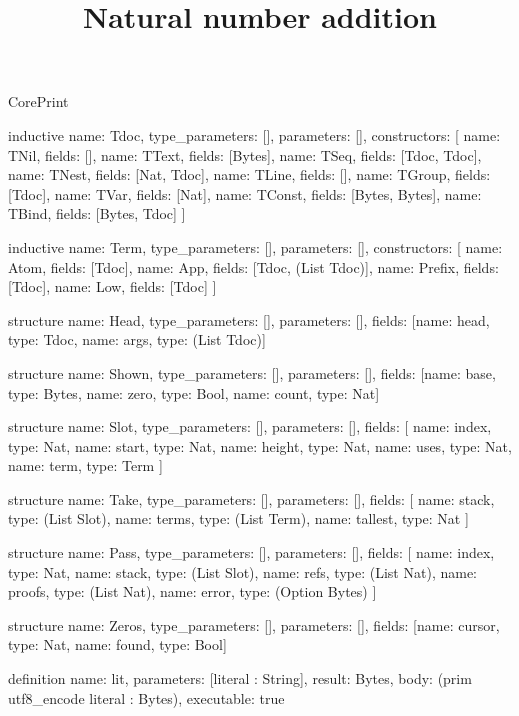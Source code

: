 \begin{lexlean}{CorePrint}
\title{Natural number addition}
\begin{semanticmodule}
inductive{
  name: Tdoc,
  type_parameters: [],
  parameters: [],
  constructors: [
    {name: TNil, fields: []},
    {name: TText, fields: [Bytes]},
    {name: TSeq, fields: [Tdoc, Tdoc]},
    {name: TNest, fields: [Nat, Tdoc]},
    {name: TLine, fields: []},
    {name: TGroup, fields: [Tdoc]},
    {name: TVar, fields: [Nat]},
    {name: TConst, fields: [Bytes, Bytes]},
    {name: TBind, fields: [Bytes, Tdoc]}
  ]
}

inductive{
  name: Term,
  type_parameters: [],
  parameters: [],
  constructors: [
    {name: Atom, fields: [Tdoc]},
    {name: App, fields: [Tdoc, (List Tdoc)]},
    {name: Prefix, fields: [Tdoc]},
    {name: Low, fields: [Tdoc]}
  ]
}

structure{
  name: Head,
  type_parameters: [],
  parameters: [],
  fields: [{name: head, type: Tdoc}, {name: args, type: (List Tdoc)}]
}

structure{
  name: Shown,
  type_parameters: [],
  parameters: [],
  fields: [{name: base, type: Bytes}, {name: zero, type: Bool}, {name: count, type: Nat}]
}

structure{
  name: Slot,
  type_parameters: [],
  parameters: [],
  fields: [
    {name: index, type: Nat},
    {name: start, type: Nat},
    {name: height, type: Nat},
    {name: uses, type: Nat},
    {name: term, type: Term}
  ]
}

structure{
  name: Take,
  type_parameters: [],
  parameters: [],
  fields: [
    {name: stack, type: (List Slot)},
    {name: terms, type: (List Term)},
    {name: tallest, type: Nat}
  ]
}

structure{
  name: Pass,
  type_parameters: [],
  parameters: [],
  fields: [
    {name: index, type: Nat},
    {name: stack, type: (List Slot)},
    {name: refs, type: (List Nat)},
    {name: proofs, type: (List Nat)},
    {name: error, type: (Option Bytes)}
  ]
}

structure{
  name: Zeros,
  type_parameters: [],
  parameters: [],
  fields: [{name: cursor, type: Nat}, {name: found, type: Bool}]
}

definition{
  name: lit,
  parameters: [literal : String],
  result: Bytes,
  body: (prim utf8_encode literal : Bytes),
  executable: true
}


\end{semanticmodule}
\end{lexlean}
